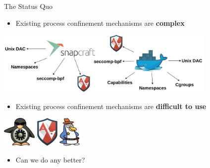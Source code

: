 \documentclass[12pt, dvipsnames]{beamer}
\begin{document}
\begin{frame}[t]{The Status Quo}
\begin{itemize}
    \item Existing process confinement mechanisms are \textbf{complex}
\end{itemize}
\begin{center}
    \includegraphics[width=0.8\textwidth]{figs/process-confinement-landscape.pdf}
\end{center}
\begin{itemize}
    \item Existing process confinement mechanisms are \textbf{difficult to use}
\end{itemize}
\begin{center}
    \includegraphics[height=4em]{figs/selinux.png}
    \hspace{3em}
    \includegraphics[height=4em]{figs/apparmor.png}
    \hspace{3em}
    \includegraphics[height=4em]{figs/tomoyo.png}
\end{center}
\begin{itemize}
    \item Can we do any better?
\end{itemize}
\end{frame}

\end{document}
